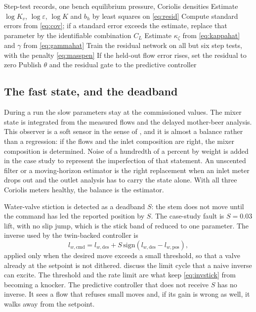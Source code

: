 \begin{algorithm}[htbp]
\caption{Commissioning of the physics-informed pressure twin}
\label{alg:twin}
\begin{algorithmic}[1]
\Require Step-test records, one bench equilibrium pressure, Coriolis densities
\State Estimate $\log K_v$, $\log\varepsilon$, $\log K$ and $b_h$ by least squares on \eqref{eq:resid}
\State Compute standard errors from \eqref{eq:cov}; if a standard error exceeds the estimate, replace that parameter by the identifiable combination $C_L$
\State Estimate $\kappa_{\zeta}$ from \eqref{eq:kappahat} and $\gamma$ from \eqref{eq:gammahat}
\State Train the residual network on all but six step tests, with the penalty \eqref{eq:masspen}
\State If the held-out flow error rises, set the residual to zero
\State Publish $\theta$ and the residual gate to the predictive controller
\end{algorithmic}
\end{algorithm}

\subsection{The fast state, and the deadband}

During a run the slow parameters stay at the commissioned values. The mixer state is integrated from the measured flows and the delayed mother-beer analysis. This observer is a soft sensor in the sense of \citet{kadlec2009}, and it is almost a balance rather than a regression: if the flows and the inlet composition are right, the mixer composition is determined. Noise of a hundredth of a percent by weight is added in the case study to represent the imperfection of that statement. An unscented filter \citep{julier2004} or a moving-horizon estimator \citep{rao2003} is the right replacement when an inlet meter drops out and the outlet analysis has to carry the state alone. With all three Coriolis meters healthy, the balance is the estimator.

Water-valve stiction is detected as a deadband $S$: the stem does not move until the command has led the reported position by $S$. The case-study fault is $S=0.03$ lift, with no slip jump, which is the stick band of \citet{choudhury2005} reduced to one parameter. The inverse used by the twin-backed controller is
\begin{equation}
\label{eq:invstick}
l_{w,\mathrm{cmd}}
=
l_{w,\mathrm{des}} + S\,\mathrm{sign}(l_{w,\mathrm{des}} - l_{w,\mathrm{pos}}),
\end{equation}
applied only when the desired move exceeds a small threshold, so that a valve already at the setpoint is not dithered. \citet{jelali2010} discuss the limit cycle that a naive inverse can excite. The threshold and the rate limit are what keep \eqref{eq:invstick} from becoming a knocker. The predictive controller that does not receive $S$ has no inverse. It sees a flow that refuses small moves and, if its gain is wrong as well, it walks away from the setpoint.

